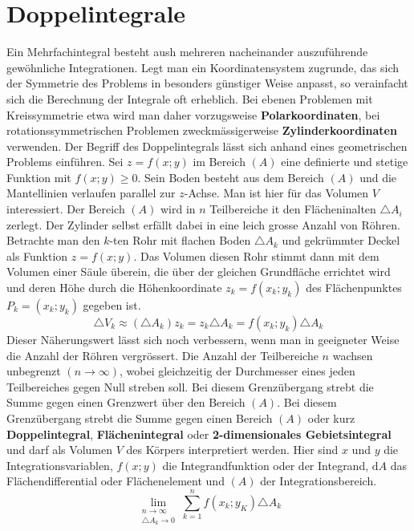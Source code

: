 \section{Doppelintegrale}
Ein Mehrfachintegral besteht aush mehreren nacheinander auszuführende gewöhnliche Integrationen. Legt man ein Koordinatensystem zugrunde, das sich der Symmetrie des Problems in besonders günstiger Weise anpasst, so verainfacht sich die Berechnung der Integrale oft erheblich. Bei ebenen Problemen mit Kreissymmetrie etwa wird man daher vorzugsweise \textbf{Polarkoordinaten}, bei rotationssymmetrischen Problemen zweckmässigerweise \textbf{Zylinderkoordinaten} verwenden.
\newline\newline
Der Begriff des Doppelintegrals lässt sich anhand eines geometrischen Problems einführen. Sei $z=f\left(x; y\right)$ im Bereich $\left(A\right)$ eine definierte und stetige Funktion mit $f\left(x; y\right)\geq 0$. Sein Boden besteht aus dem Bereich $\left(A\right)$ und die Mantellinien verlaufen parallel zur $z$-Achse. Man ist hier für das Volumen $V$ interessiert.
\newline\newline
Der Bereich $\left(A\right)$ wird in $n$ Teilbereiche it den Flächeninalten $\triangle A_i$ zerlegt. Der Zylinder selbst erfällt dabei in eine leich grosse Anzahl von Röhren. Betrachte man den $k$-ten Rohr mit flachen Boden $\triangle A_k$ und gekrümmter Deckel als Funktion $z=f\left(x; y\right)$. Das Volumen diesen Rohr stimmt dann mit dem Volumen einer Säule überein, die über der gleichen Grundfläche errichtet wird und deren Höhe durch die Höhenkoordinate $z_k=f\left(x_k; y_k\right)$ des Flächenpunktes $P_k=\left(x_k; y_k\right)$ gegeben ist.
\begin{equation}
\boxed{\triangle V_k\approx \left(\triangle A_k\right)z_k=z_k\triangle A_k=f\left(x_k; y_k\right)\triangle A_k}
\end{equation}
Dieser Näherungswert lässt sich noch verbessern, wenn man in geeigneter Weise die Anzahl der Röhren vergrössert. Die Anzahl der Teilbereiche $n$ wachsen unbegrenzt $\left(n\rightarrow \infty\right)$, wobei gleichzeitig der Durchmesser eines jeden Teilbereiches gegen Null streben soll. Bei diesem Grenzübergang strebt die Summe gegen einen Grenzwert über den Bereich $\left(A\right)$.
\newline\newline
Bei diesem Grenzübergang strebt die Summe gegen einen Bereich $\left(A\right)$ oder kurz \textbf{Doppelintegral}, \textbf{Flächenintegral} oder \textbf{2-dimensionales Gebietsintegral} und darf als Volumen $V$ des Körpers interpretiert werden. Hier sind $x$ und $y$ die Integrationsvariablen, $f\left(x; y\right)$ die Integrandfunktion oder der Integrand, $\text{d}A$ das Flächendifferential oder Flächenelement und $\left(A\right)$ der Integrationsbereich.
\begin{equation}
\boxed{\displaystyle \lim_{\substack{n\rightarrow \infty\\\triangle A_k\rightarrow 0}} \displaystyle \sum_{k=1}^nf\left(x_k; y_K\right)\triangle A_k}
\end{equation}
